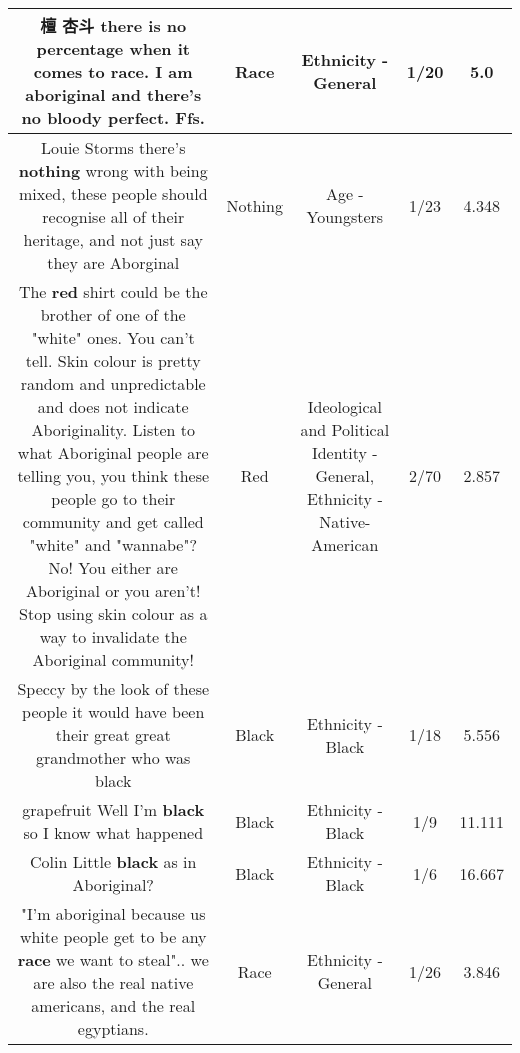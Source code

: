\documentclass[11pt]{article}
\newlength\mylength
\begin{document}
\begin{center}
\begin{longtable}{|C{.65\mylength}|C{.30\mylength}|C{.12\mylength}|C{.12\mylength}|C{.12\mylength}|}
  \small 檀 杏斗 there is no percentage when it comes to \textbf{race}. I am aboriginal and there's no bloody perfect. Ffs.\normalsize   & Race & Ethnicity - General & 1/20 & 5.0 \\  \hline
  \small Louie Storms there's \textbf{nothing} wrong with being mixed, these people should recognise all of their heritage, and not just say they are Aborginal\normalsize   & Nothing & Age - Youngsters & 1/23 & 4.348 \\  \hline
  \small The \textbf{r\textbf{ed}} shirt could be the brother of one of the "white" ones.  You can't tell.  Skin colour is pretty random and unpredictable and does not indicate Aboriginality.  Listen to what Aboriginal people are telling you, you think these people go to their community and get called "white" and "wannabe"?  No!  You either are Aboriginal or you aren't!  Stop using skin colour as a way to invalidate the Aboriginal community!\normalsize   & Red &  Ideological and Political Identity - General, Ethnicity - Native-American & 2/70 & 2.857 \\  \hline
  \small Speccy by the look of these people it would have been their great great grandmother who was black\normalsize   & Black & Ethnicity - Black & 1/18 & 5.556 \\  \hline
  \small grapefruit Well I'm \textbf{black} so I know what happened\normalsize   & Black & Ethnicity - Black & 1/9 & 11.111 \\  \hline
  \small Colin Little \textbf{black} as in Aboriginal?\normalsize   & Black & Ethnicity - Black & 1/6 & 16.667 \\  \hline
  \small "I'm aboriginal because us white people get to be any \textbf{race} we want to steal".. we are also the real native americans, and the real egyptians.\normalsize   & Race & Ethnicity - General & 1/26 & 3.846 \\  \hline

\end{longtable}
\end{center}
\end{document}
